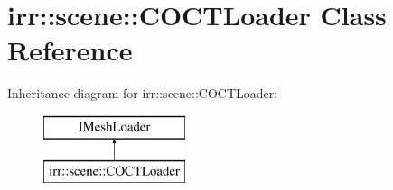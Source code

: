 \hypertarget{classirr_1_1scene_1_1_c_o_c_t_loader}{\section{irr\-:\-:scene\-:\-:C\-O\-C\-T\-Loader Class Reference}
\label{classirr_1_1scene_1_1_c_o_c_t_loader}
}
Inheritance diagram for irr\-:\-:scene\-:\-:C\-O\-C\-T\-Loader\-:\begin{figure}[H]
\begin{center}
\leavevmode
\includegraphics[height=2.000000cm]{classirr_1_1scene_1_1_c_o_c_t_loader}
\end{center}
\end{figure}
